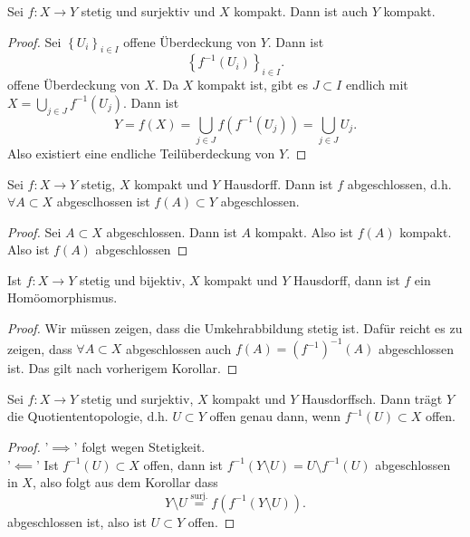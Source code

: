 \begin{theorem}
    Sei $f: X \to  Y$ stetig und surjektiv und $X$ kompakt. Dann ist auch  $Y$ kompakt. 
    \label{thm:image-of-compact-space-is-compact}
\end{theorem}
\begin{proof}
    Sei $\left \{U_i\right\} _{i \in I}$ offene Überdeckung von $Y$. Dann ist
     \[
         \left \{f^{-1}(U_i)\right\} _{i \in I}
    .\] 
    offene Überdeckung von $X$. Da  $X$ kompakt ist, gibt es  $J\subset I$ endlich mit $X = \bigcup_{j\in J} f^{-1}(U_j)$. Dann ist 
    \[
        Y = f(X) = \bigcup_{j\in J} f(f^{-1}(U_j)) = \bigcup_{j\in J} U_j
    .\] 
    Also existiert eine endliche Teilüberdeckung von $Y$.
\end{proof}
\begin{corollary}
    Sei $f: X \to  Y$ stetig, $X$ kompakt und  $Y$ Hausdorff. Dann ist  $f$ abgeschlossen, d.h. $\forall A\subset X$ abgesclhossen ist $f(A) \subset Y$ abgeschlossen.
\end{corollary}
\begin{proof}
    Sei $A\subset X$ abgeschlossen. Dann ist $A$ kompakt. Also ist  $f(A)$ kompakt. Also ist  $f(A)$ abgeschlossen
\end{proof}
\begin{corollary}
    Ist $f: X \to  Y$ stetig und bijektiv, $X$ kompakt und  $Y$ Hausdorff, dann ist  $f$ ein Homöomorphismus.
\end{corollary}
\begin{proof}
    Wir müssen zeigen, dass die Umkehrabbildung stetig ist. Dafür reicht es zu zeigen, dass $\forall A\subset X$ abgeschlossen auch $f(A) = (f^{-1})^{-1}(A)$ abgeschlossen ist. Das gilt nach vorherigem Korollar.
\end{proof}
\begin{corollary}
    Sei $f: X \to  Y$ stetig und surjektiv, $X$ kompakt und  $Y$ Hausdorffsch. Dann trägt  $Y$ die Quotiententopologie, d.h.  $U\subset Y$ offen genau dann, wenn $f^{-1}(U) \subset X$ offen.
\end{corollary}
\begin{proof}
    '$\implies$' folgt wegen Stetigkeit. \\
    '$\impliedby$' Ist $f^{-1}(U) \subset X$ offen, dann ist $f^{-1}(Y \setminus U ) = U \setminus f^{-1}(U)$ abgeschlossen in $X$, also folgt aus dem Korollar dass
     \[
         Y \setminus U \stackrel{\text{surj.}}{=}   f\left( f^{-1}\left( Y \setminus U \right)  \right) 
    .\] 
    abgeschlossen ist, also ist $U\subset Y$ offen.
\end{proof}
